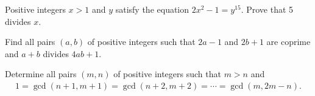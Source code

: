 \documentclass{subfile}
\begin{document}
	\begin{problem}
		Positive integers $x>1$ and $y$ satisfy the equation $2x^2-1=y^{15}$. Prove that 5 divides $x$. %
	\end{problem}


	\begin{problem}
		Find all pairs $(a,b)$ of positive integers such that $2a-1$ and $2b+1$ are coprime and $a+b$ divides $4ab+1.$ %
	\end{problem}




	\begin{problem}
		Determine all pairs $(m, n)$ of positive integers such that $m>n$ and
			\begin{align*}
				1 = \gcd(n+1,m+1) = \gcd(n+2,m+2) = \cdots = \gcd(m,2m-n).
			\end{align*}
	\end{problem}
\end{document}
